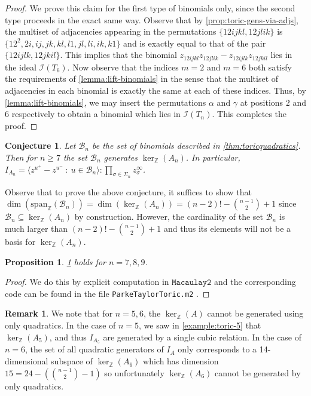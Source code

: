 \documentclass[12pt, reqno]{amsart}
\numberwithin{equation}{section}
\theoremstyle{plain}
\newtheorem{conjecture}[theorem]{Conjecture}
\newtheorem{proposition}[theorem]{Proposition}
\theoremstyle{definition}
\newtheorem{remark}[theorem]{Remark}
\newcommand{\zz}{\mathbb{Z}}
\newcommand{\ci}{\mathcal{I}}
\newcommand{\cb}{\mathcal{B}}
\begin{document}
\begin{proof}
We prove this claim for the first type of binomials only, since the second type proceeds in the exact same way. Observe that by \cref{prop:toric-gens-via-adjs}, the multiset of adjacencies appearing in the permutations $\{12ijkl, 12jlik\}$ is $\{12^2, 2i, ij, jk, kl, l1, jl, li, ik, k1\}$ and is exactly equal to that of the pair $\{12ijlk, 12jkil\}$. This implies that the binomial $z_{12ijkl} z_{12jlik} - z_{12ijlk} z_{12jkil}$ lies in the ideal $\ci(T_6)$. Now observe that the indices $m = 2$ and $m = 6$ both satisfy the requirements of \cref{lemma:lift-binomials} in the sense that the multiset of adjacencies in each binomial is exactly the same at each of these indices. Thus, by \cref{lemma:lift-binomials}, we may insert the permutations $\alpha$ and $\gamma$ at positions $2$ and $6$ respectively to obtain a binomial which lies in $\ci(T_n)$. This completes the proof. 
\end{proof}


\begin{conjecture}
\label{conj:toric-quads-gen-ker}
Let $\cb_n$ be the set of binomials described in \cref{thm:toricquadratics}. Then for $n\geq 7$ the set $\cb_n$ generates $\ker_\zz(A_n)$. In particular, $I_{A_n} = \langle z^{u^+} - z^{u^-} ~:~ u \in \mathcal{B}_n \rangle : \prod_{\sigma \in \Sigma_n} z_\sigma^\infty$.
\end{conjecture}

Observe that to prove the above conjecture, it suffices to show that $\dim(\mathrm{span}_\zz(\cb_n)) = \dim(\ker_\zz(A_n)) = (n-2)! - \binom{n-1}{2} + 1$ since $\cb_n \subseteq \ker_\zz(A_n)$ by construction. However, the cardinality of the set $\cb_n$ is much larger than $(n-2)! - \binom{n-1}{2} + 1$ and thus its elements will not be a basis for $\ker_\zz(A_n)$. 

\begin{proposition}
\cref{conj:toric-quads-gen-ker} holds for $n = 7, 8, 9$. 
\end{proposition}
\begin{proof}
We do this by explicit computation in $\texttt{Macaulay2}$ and the corresponding code can be found in the file \texttt{ParkeTaylorToric.m2} \cite{zenodo}. 
\end{proof}

\begin{remark}
We note that for $n = 5, 6$, the $\ker_\zz(A)$ cannot be generated using only quadratics. In the case of $n = 5$, we saw in \cref{example:toric-5} that $\ker_\zz(A_5)$, and thus $I_{A_5}$ are generated by a single cubic relation. In the case of $n = 6$, the set of all quadratic generators of $I_A$ only corresponds to a 14-dimensional subspace of $\ker_\zz(A_6)$ which has dimension $15 = 24 - (\binom{n-1}{2} - 1)$ so unfortunately $\ker_\zz(A_6)$ cannot be generated by only quadratics. 
\end{remark}
\end{document}
